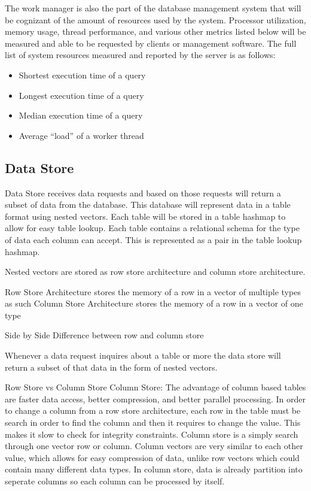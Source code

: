 \documentclass[letterpaper, 12pt]{article}
\renewcommand{\includegraphics}[2][]{\fbox{}}
\begin{document}
The work manager is also the part of the database management system that will be cognizant
of the amount of resources used by the system. Processor utilization, memory usage, thread
performance, and various other metrics listed below will be measured and able to be
requested by clients or management software. The full list of system resources measured
and reported by the server is as follows:
\begin{itemize}
 \item Shortest execution time of a query
 \item Longest execution time of a query
 \item Median execution time of a query
 \item Average ``load'' of a worker thread
\end{itemize}
\par\vspace{\baselineskip}

\subsection{Data Store}
Data Store receives data requests and based on those requests will return a subset of data from
the database. This database will represent data in a table format using nested vectors. Each table
will be stored in a table hashmap to allow for easy table lookup. Each table contains a relational
schema for the type of data each column can accept. This is represented as a pair in the table 
lookup hashmap.


Nested vectors are stored as row store architecture and column store architecture.

Row Store Architecture stores the memory of a row in a vector of multiple types as such
Column Store Architecture stores the memory of a row in a vector of one type

Side by Side Difference between row and column store

Whenever a data request inquires about a table or more the data store will return a subset of that
data in the form of nested vectors. 


Row Store vs Column Store
Column Store:
The advantage of column based tables are faster data access, better compression, and better parallel processing.
In order to change a column from a row store architecture, each row in the table must be search in order to find the
column and then it requires to change the value. This makes it slow to check for integrity constraints. Column store 
is a simply search through one vector row or column. Column vectors are very similar to each other value, which allows
for easy compression of data, unlike row vectors which could contain many different data types. In column store, data
is already partition into seperate columns so each column can be processed by itself. 
\end{document}
